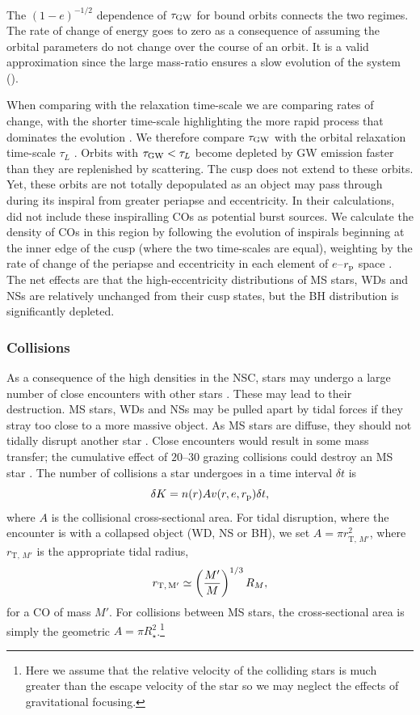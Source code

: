 The $(1-e)^{-1/2}$ dependence of $\tau_\mathrm{GW}$ for bound orbits connects the two regimes. The rate of change of energy goes to zero as a consequence of assuming the orbital parameters do not change over the course of an orbit. It is a valid approximation since the large mass-ratio ensures a slow evolution of the system ().

When comparing with the relaxation time-scale we are comparing rates of change, with the shorter time-scale highlighting the more rapid process that dominates the evolution \citep{Amaro-Seoane2007}. We therefore compare $\tau_\mathrm{GW}$ with the orbital relaxation time-scale $\tau_L$ \citep{Merritt2011}. Orbits with $\tau_\mathrm{GW} < \tau_L$ become depleted by GW emission faster than they are replenished by scattering. The cusp does not extend to these orbits. Yet, these orbits are not totally depopulated as an object may pass through during its inspiral from greater periapse and eccentricity. In their calculations, \citet{Hopman2007} did not include these inspiralling COs as potential burst sources. We calculate the density of COs in this region by following the evolution of inspirals beginning at the inner edge of the cusp (where the two time-scales are equal), weighting by the rate of change of the periapse and eccentricity in each element of $e$--$r_\mathrm{p}$ space \citep{Peters1964}. The net effects are that the high-eccentricity distributions of MS stars, WDs and NSs are relatively unchanged from their cusp states, but the BH distribution is significantly depleted.

\subsubsection{Collisions}\label{sec:Collision}

As a consequence of the high densities in the NSC, stars may undergo a large number of close encounters with other stars \citep{Cohn1978}. These may lead to their destruction. MS stars, WDs and NSs may be pulled apart by tidal forces if they stray too close to a more massive object. As MS stars are diffuse, they should not tidally disrupt another star \citep{Murphy1991,Freitag2005}. Close encounters would result in some mass transfer; the cumulative effect of $20$--$30$ grazing collisions could destroy an MS star \citep{Freitag2006}. The number of collisions a star undergoes in a time interval $\delta t$ is
\begin{equation}
\delta K = n(r) A v(r,e,r_\mathrm{p})\delta t,
\end{equation}
where $A$ is the collisional cross-sectional area. For tidal disruption, where the encounter is with a collapsed object (WD, NS or BH), we set $A = \pi r_{\mathrm{T},\,{M'}}^2$, where $r_{\mathrm{T},\,{M'}}$ is the appropriate tidal radius,
\begin{equation}
r_\mathrm{T,\,{M'}} \simeq \left(\dfrac{M'}{M}\right)^{1/3}R_M,
\end{equation}
for a CO of mass $M'$. For collisions between MS stars, the cross-sectional area is simply the geometric $A = \pi R_\star^2$.\footnote{Here we assume that the relative velocity of the colliding stars is much greater than the escape velocity of the star so we may neglect the effects of gravitational focusing.}


